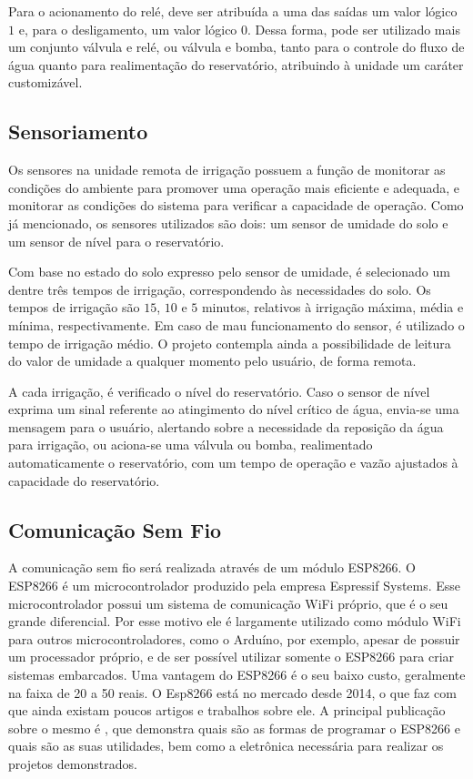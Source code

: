 \documentclass[conference]{IEEEtran}
\begin{document}
Para o acionamento do relé, deve ser atribuída a uma das saídas um valor lógico $1$ e, para o desligamento, um valor lógico $0$. Dessa forma, pode ser utilizado mais um conjunto válvula e relé, ou válvula e bomba, tanto para o controle do fluxo de água quanto para realimentação do reservatório, atribuindo à unidade um caráter customizável.

\subsection{Sensoriamento}

Os sensores na unidade remota de irrigação possuem a função de monitorar as condições do ambiente para promover uma operação mais eficiente e adequada, e monitorar as condições do sistema para verificar a capacidade de operação. Como já mencionado, os sensores utilizados são dois: um sensor de umidade do solo e um sensor de nível para o reservatório.

Com base no estado do solo expresso pelo sensor de umidade, é selecionado um dentre três tempos de irrigação, correspondendo às necessidades do solo. Os tempos de irrigação são $15$, $10$ e $5$ minutos, relativos à irrigação máxima, média e mínima, respectivamente. Em caso de mau funcionamento do sensor, é utilizado o tempo de irrigação médio. O projeto contempla ainda a possibilidade de leitura do valor de umidade a qualquer momento pelo usuário, de forma remota.

A cada irrigação, é verificado o nível do reservatório. Caso o sensor de nível exprima um sinal referente ao atingimento do nível crítico de água, envia-se uma mensagem para o usuário, alertando sobre a necessidade da reposição da água para irrigação, ou aciona-se uma válvula ou bomba, realimentado automaticamente o reservatório, com um tempo de operação e vazão ajustados à capacidade do reservatório.

\subsection{Comunicação Sem Fio}

A comunicação sem fio será realizada através de um módulo ESP8266. O ESP8266 é um microcontrolador produzido pela empresa Espressif Systems. Esse microcontrolador possui um sistema de comunicação WiFi próprio, que é o seu grande diferencial. Por esse motivo ele é largamente utilizado como módulo WiFi para outros microcontroladores, como o Arduíno, por exemplo, apesar de possuir um processador próprio, e de ser possível utilizar somente o ESP8266 para criar sistemas embarcados. Uma vantagem do ESP8266 é o seu baixo custo, geralmente na faixa de 20 a 50 reais. O Esp8266 está no mercado desde 2014, o que faz com que ainda existam poucos artigos e trabalhos sobre ele. A principal publicação sobre o mesmo é \cite{b2}, que demonstra quais são as formas de programar o ESP8266 e quais são as suas utilidades, bem como a eletrônica necessária para realizar os projetos demonstrados.
\end{document}
